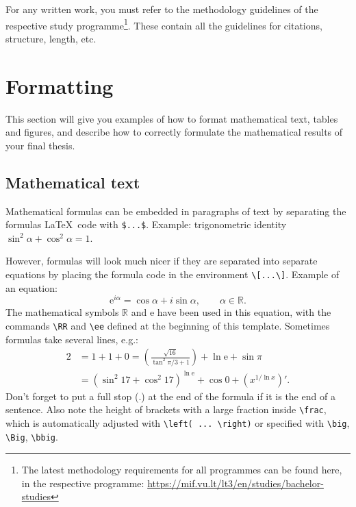 \documentclass[]{VUMIFTemplateClass}
\newcommand{\ee}{{\mathrm e}}  %
\newcommand{\RR}{\mathbb{R}}
\begin{document}
For any written work, you must refer to the methodology guidelines of the respective study programme\footnote{The latest methodology requirements for all programmes can be found here, in the respective programme: \url{https://mif.vu.lt/lt3/en/studies/bachelor-studies}}. These contain all the guidelines for citations, structure, length, etc.


\section{Formatting}

This section will give you examples of how to format mathematical text, tables and figures, and describe how to correctly formulate the mathematical results of your final thesis.

\subsection{Mathematical text}

Mathematical formulas can be embedded in paragraphs of text by separating the formulas \LaTeX~code with \texttt{\$...\$}. Example: trigonometric identity $\sin^2 \alpha + \cos^2 \alpha = 1$.

However, formulas will look much nicer if they are separated into separate equations by placing the formula code in the environment \texttt{\textbackslash[...\textbackslash]}. Example of an equation:
\[
\ee^{i \alpha} = \cos{\alpha} + i \sin{\alpha}, \qquad \alpha \in \RR.
\]
The mathematical symbols $\RR$ and $\ee$ have been used in this equation, with the commands \texttt{\textbackslash RR} and \texttt{\textbackslash ee} defined at the beginning of this template. Sometimes formulas take several lines, e.g.:
\begin{equation}
\begin{split}
2&= 1+1+0=\left(\frac{\sqrt{16}}{\tan^2\pi/3+1}\right) +\ln\ee+\sin\pi\\
&= (\sin^2 17+\cos^2 17)^{\ln\ee}+\cos 0 +(x^{1/\ln x})'. 
\label{form1}
\end{split}
\end{equation}
Don't forget to put a full stop (.) at the end of the formula if it is the end of a sentence. Also note the height of brackets with a large fraction inside \texttt{\textbackslash frac}, which is automatically adjusted with \texttt{\textbackslash left( ... \textbackslash right)} or specified with \texttt{\textbackslash big}, \texttt{\textbackslash Big}, \texttt{\textbackslash bbig}.
\end{document}
